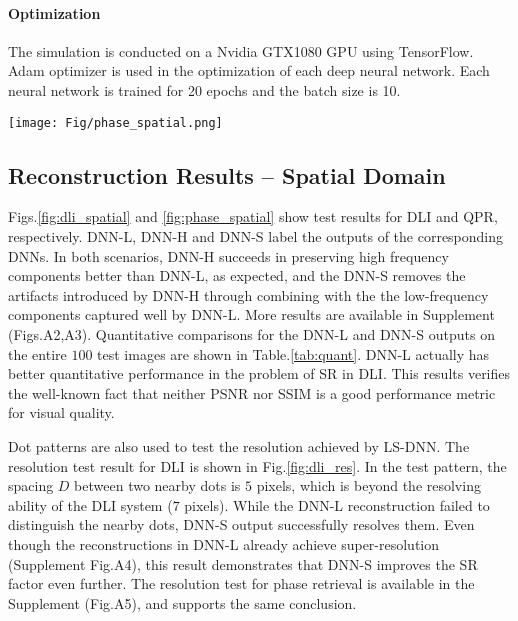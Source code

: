 \documentclass[10pt,twocolumn,letterpaper]{article}
\begin{document}
\paragraph{Optimization}
The simulation is conducted on a Nvidia GTX1080 GPU using TensorFlow\cite{tensorflow2015-whitepaper}. Adam optimizer\cite{kingma2014adam} is used in the optimization of each deep neural network.  Each neural network is trained for 20 epochs and the batch size is 10.

\begin{figure*}[h!]
\centering\texttt{[image: Fig/phase\_spatial.png]}
\caption{Reconstruction results for QPR.}
\label{fig:phase_spatial}
\end{figure*}

\subsection{Reconstruction Results -- Spatial Domain}
Figs.\ref{fig:dli_spatial} and \ref{fig:phase_spatial} show test results for DLI and QPR, respectively. DNN-L, DNN-H and DNN-S label the outputs of the corresponding DNNs. In both scenarios, DNN-H succeeds in preserving high frequency components better than DNN-L, as expected, and the DNN-S removes the artifacts introduced by DNN-H through combining with the the low-frequency components captured well by DNN-L. More results are available in Supplement (Figs.A2,A3). Quantitative comparisons for the DNN-L and DNN-S outputs on the entire $100$ test images are shown in Table.\ref{tab:quant}. DNN-L actually has better quantitative performance in the problem of SR in DLI. This results verifies the well-known fact that neither PSNR nor SSIM is a good performance metric for visual quality\cite{gupta2011modified,wang2004image,wang2003multiscale,johnson2016perceptual,ledig2017photo}.

Dot patterns are also used to test the resolution achieved by LS-DNN. The resolution test result for DLI is shown in Fig.\ref{fig:dli_res}. In the test pattern, the spacing $D$ between two nearby  dots is $5$ pixels, which is beyond the resolving ability of the DLI system ($7$ pixels). While the DNN-L reconstruction failed to distinguish the nearby dots, DNN-S output successfully resolves them. Even though the reconstructions in DNN-L already achieve super-resolution (Supplement Fig.A4), this result demonstrates that DNN-S improves the SR factor even further. The resolution test for phase retrieval is available in the Supplement (Fig.A5), and supports the same conclusion. 
\end{document}
